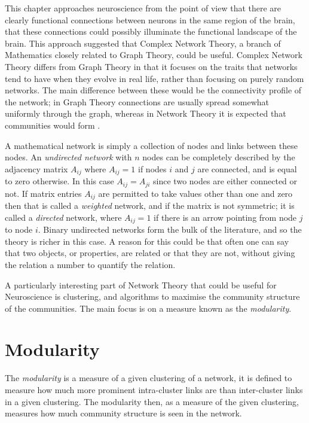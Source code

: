 
This chapter approaches neuroscience from the point of view that there are
clearly functional connections between neurons in the same region of the brain,
that these connections could possibly illuminate the functional landscape of the
 brain.  This approach suggested that Complex Network Theory, a branch 
of Mathematics closely related to Graph Theory, could be useful. Complex Network Theory differs from 
Graph Theory in that it focuses on the traits that networks tend to have when they evolve in real life, rather than focusing on purely random networks.  
The main difference between these would be the connectivity profile of the 
network; in Graph Theory connections are usually spread somewhat uniformly 
through the graph, whereas in Network Theory it is  expected that communities would form \cite{Newman2010a}.

A mathematical network is simply a collection of nodes and links between
these nodes.  An \emph{undirected network} with $n$ nodes can be
completely described by the adjacency matrix $A_{ij}$ where $A_{ij} =
1$ if nodes $i$ and $j$ are connected, and is equal to zero otherwise. In this 
case $A_{ij} = A_{ji}$ since two nodes are either connected or
not.  If matrix entries $A_{ij}$ are permitted to take values other than one and zero
then that is called a \emph{weighted} network, and if the matrix is not symmetric; it is called a \emph{directed} network, where $A_{ij} = 1$ if there 
is an arrow pointing from node $j$ to node $i$.   Binary undirected networks form the bulk of the literature, and so the theory is richer
in this case. A reason for this could be that often one can say that two objects, or properties, are 
related or that they are not, without giving the relation a number to quantify the relation.

A particularly interesting part of Network Theory that could be useful for
Neuroscience is clustering, and algorithms to maximise the community structure of the communities.  The main focus is on a measure known as the
\emph{modularity}.

\section{Modularity}

The \emph{modularity} is a measure of a given clustering of a network,  it is defined to measure how much more prominent
intra-cluster links are than inter-cluster links in a given
clustering. The modularity then, as a measure of the given clustering, measures how much community structure is seen in the network.  


